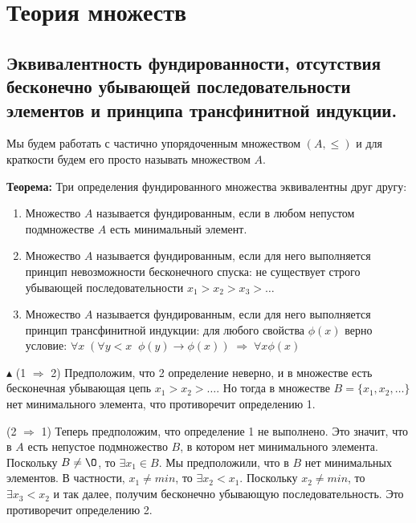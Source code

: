 \section{Теория множеств}

\subsection{Эквивалентность фундированности, отсутствия бесконечно убывающей последовательности элементов и принципа трансфинитной индукции.}
\noindent Мы будем работать с частично упорядоченным множеством $(A, \leqslant)$ и для краткости будем его просто называть множеством $A$.
\newline \par \textbf{Теорема:} Три определения фундированного множества эквивалентны друг другу:
\begin{enumerate}
    \item Множество $A$ называется фундированным, если в любом непустом подмножестве $A$ есть минимальный элемент.

    \item Множество $A$ называется фундированным, если для него выполняется принцип невозможности бесконечного спуска: не существует строго убывающей последовательности \newline $x_1>x_2>x_3>\ldots$
    
    \item Множество $A$ называется фундированным, если для него выполняется принцип трансфинитной индукции: для любого свойства $\phi(x)$ верно условие: \newline $\forall x \; (\forall y<x \;\; \phi(y)\to \phi(x) ) \;\Rightarrow\; \forall x \phi(x)$
\end{enumerate}

$\blacktriangle$ (1 $\Rightarrow$ 2) Предположим, что 2 определение неверно, и в множестве есть бесконечная убывающая цепь $x_1 > x_2>\ldots$. Но тогда в множестве $B = \{x_1, x_2, \ldots\}$ нет минимального элемента, что противоречит определению 1.

\par 
(2 $\Rightarrow$ 1) Теперь предположим, что определение 1 не выполнено. Это значит, что в $A$ есть непустое подмножество $B$, в котором нет минимального элемента. Поскольку $B\neq \O$, то $\exists x_1\in B$. Мы предположили, что в $B$ нет минимальных элементов. В частности, $x_1\neq min$, то $\exists x_2 < x_1$. Поскольку $x_2\neq min$, то $\exists x_3 < x_2$ и так далее, получим бесконечно убывающую последовательность. Это противоречит определению 2.

